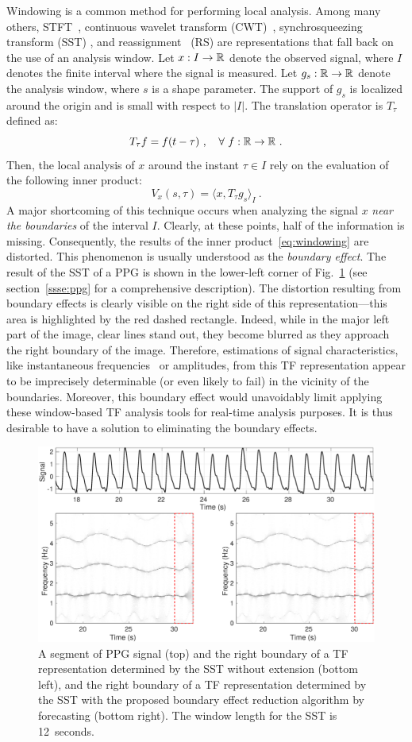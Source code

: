 \documentclass[journal]{IEEEtran}
\begin{document}
Windowing is a common method for performing local analysis. Among many others, STFT~\cite{Flandrin:1999}, continuous wavelet transform (CWT)~\cite{Da1992}, synchrosqueezing transform (SST) \cite{Daubechies11synchrosqueezed}, and reassignment~\cite{Auger13time} (RS) are representations that fall back on the use of an analysis window. Let $x:I\to{\mathbb R}$ denote the observed signal, where $I$ denotes the finite interval where the signal is measured. Let $g_s:{\mathbb R}\to{\mathbb R}$ denote the analysis window, where $s$ is a shape parameter. The support of $g_s$ is localized around the origin and is small with respect to $|I|$. The translation operator is $T_\tau$ defined as:
\[
T_\tau f = f(t-\tau)\ ,\quad \forall\ f:{\mathbb R}\to{\mathbb R}\ .
\]
Then, the local analysis of $x$ around the instant $\tau\in I$ rely on the evaluation of the following inner product:
\begin{equation}
V_x(s,\tau) = \langle x, T_\tau g_s \rangle_I \ .
\label{eq:windowing}
\end{equation}
A major shortcoming of this technique occurs when analyzing the signal $x$ {\em near the boundaries} of the interval $I$. Clearly, at these points, half of the information is missing. Consequently, the results of the inner product~\eqref{eq:windowing} are distorted. This phenomenon is usually understood as the \emph{boundary effect}. The result of the SST of a PPG is shown in the lower-left corner of Fig.~\ref{fig:ex.intro} (see section~\ref{ssse:ppg} for a comprehensive description). The distortion resulting from boundary effects is clearly visible on the right side of this representation---this area is highlighted by the red dashed rectangle. Indeed, while in the major left part of the image, clear lines stand out, they become blurred as they approach the right boundary of the image. Therefore, estimations of signal characteristics, like instantaneous frequencies~\cite{Delprat92asymptotic} or amplitudes, from this TF representation appear to be imprecisely determinable (or even likely to fail) in the vicinity of the boundaries. Moreover, this boundary effect would unavoidably limit applying these window-based TF analysis tools for real-time analysis purposes. It is thus desirable to have a solution to eliminating the boundary effects.

\begin{figure}
\centering
\includegraphics[width=.48\textwidth]{PPGsig.eps}
\caption{A segment of PPG signal (top) and the right boundary of a TF representation determined by the SST without extension (bottom left), and the right boundary of a TF representation determined by the SST with the proposed boundary effect reduction algorithm by forecasting (bottom right). The window length for the SST is 12~seconds.}
\label{fig:ex.intro}
\end{figure}
\end{document}
